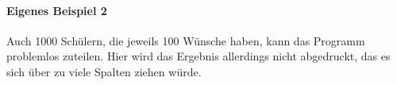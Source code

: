 \documentclass[a4paper,10pt,ngerman]{scrartcl}
\begin{document}
\paragraph{Eigenes Beispiel 2}
Auch 1000 Schülern, die jeweils 100 Wünsche haben, kann das Programm problemlos zuteilen.
Hier wird das Ergebnis allerdings nicht abgedruckt, das es sich über zu viele Spalten ziehen würde.
\end{document}
